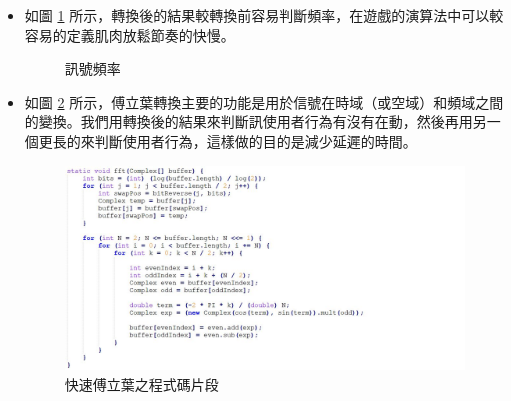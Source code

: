 \documentclass[12pt]{article}  %
\theoremstyle{plain}
\begin{document}
\begin{itemize}
\begin{itemize}
\item 如圖 \ref{訊號頻率} 所示，轉換後的結果較轉換前容易判斷頻率，在遊戲的演算法中可以較容易的定義肌肉放鬆節奏的快慢。
\begin{figure}[htbp]
\quad
{}
\caption{訊號頻率} \label{訊號頻率}
\end{figure}

\item 如圖 \ref{快速傅立葉之程式碼片段} 所示，傅立葉轉換主要的功能是用於信號在時域（或空域）和頻域之間的變換。我們用轉換後的結果來判斷訊使用者行為有沒有在動，然後再用另一個更長的來判斷使用者行為，這樣做的目的是減少延遲的時間。
\begin{figure}[htbp]
\centering
\includegraphics[width=15cm]{pic/ch3/code-快速傅立葉.JPG}
\caption{快速傅立葉之程式碼片段} \label{快速傅立葉之程式碼片段}
\end{figure}
\newpage


\end{itemize}
\end{itemize}
\end{document}

